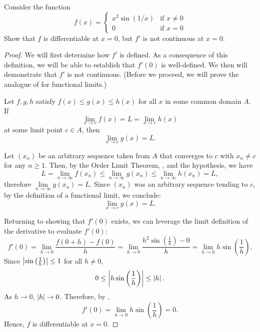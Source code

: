 \begin{problem}
  Consider the function
    \begin{equation*}
      f(x) = 
      \begin{cases}
        x^2 \sin(1/x) & \text{if } x \neq 0 \\
        0 & \text{if } x = 0
      \end{cases}
    \end{equation*}
  Show that $f$ is differentiable at $x = 0$, but $f'$ is not continuous at $x = 0$.

  \begin{proof}
    We will first determine how $f'$ is defined. As a consequence of this definition, we will be able to establish
    that $f'(0)$ is well-defined. We then will demonstrate that $f'$ is not continuous.
    (Before we proceed, we will prove the analogue of  for 
    functional limits.)

    \begin{theorem}
      \label{thm:squeeze-theorem-fn-limits}
      Let $f, g, h$ satisfy $f(x) \leq g(x) \leq h(x)$ for all $x$ in some common domain $A$. If
      \[
        \lim_{x \to c} f(x) = L = \lim_{x \to c} h(x)
      \]
      at some limit point $c \in A$, then
      \[
        \lim_{x \to c} g(x) = L.
      \]
    \end{theorem}

    \begin{subproof}
      Let $(x_{n})$ be an arbitrary sequence taken from $A$ that converges to
      $c$ with $x_{n} \neq c$ for any $n \geq 1$. Then, by the Order Limit
      Theorem, , and the hypothesis, we
      have
      \[
        L = \lim_{n \to \infty} f(x_{n}) \leq \lim_{n \to \infty} g(x_{n}) \leq \lim_{n \to \infty} h(x_{n}) = L,
      \]
      therefore $\lim\limits_{n \to \infty} g(x_{n}) = L$. Since $(x_{n})$ was
      an arbitrary sequence tending to $c$, by the definition of a functional limit,
      we conclude:
      \[
        \lim_{x \to c} g(x) = L.
      \]
    \end{subproof}

    Returning to showing that $f'(0)$ exists, we can leverage the limit
    definition of the derivative to evaluate $f'(0)$:
    \[
      f'(0) = \lim_{h \to 0} \frac{f(0+h) - f(0)}{h} = \lim_{h \to 0} \frac{h^2 \sin \left( \frac{1}{h} \right) - 0}{h} = \lim_{h \to 0} h \sin \left( \frac{1}{h} \right).
    \]
    Since $\left\lvert \sin \left( \frac{1}{h} \right) \right\rvert \leq 1$ for all $h \neq 0$,
    \[
      0 \leq \left\lvert h \sin \left( \frac{1}{h} \right) \right\rvert \leq \left\lvert h \right\rvert.
    \]
    As $h \to 0$, $\left\lvert h \right\rvert \to 0$. Therefore, by ,
    \[
      f'(0) = \lim_{h \to 0} h \sin\left(\frac{1}{h}\right) = 0.
    \]
    Hence, $f$ is differentiable at $x = 0$.


\end{proof}
\end{problem}
